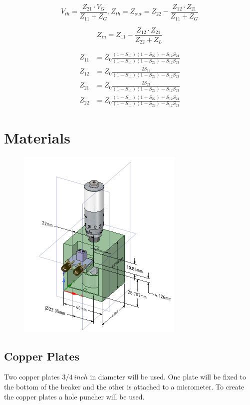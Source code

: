 \documentclass[journal]{IEEEtran}
\begin{document}
\begin{equation}
\label{thevenin-equation-1}
V_{th} = \frac{Z_{21}\cdot V_G}{Z_{11}+Z_{G}}, Z_{th}=Z_{out}=Z_{22}-\frac{Z_{12}\cdot Z_{21}}{Z_{11}+Z_G}
\end{equation}

\begin{equation}
\label{thevenin-equation-1}
Z_{in}=Z_{11}-\frac{Z_{12}\cdot Z_{21}}{Z_{22}+Z_L}
\end{equation}

\begin{align*}
\label{s-conversion-z}
Z_{11} &= Z_0\frac{(1+S_{11})(1-S_{22})+S_{12}S_{21}}{ (1-S_{11})(1-S_{22})-S_{12}S_{21}} \\
Z_{12} &= Z_0\frac{2S_{12}}{ (1-S_{11})(1-S_{22})-S_{12}S_{21}} \\
Z_{21} &= Z_0\frac{2S_{21}}{ (1-S_{11})(1-S_{22})-S_{12}S_{21}} \\
Z_{22} &= Z_0\frac{ (1-S_{11})(1+S_{22})+S_{12}S_{21}}{ (1-S_{11})(1-S_{22})-S_{12}S_{21}}
\end{align*}

\section{Materials}

\begin{figure}[h]
\label{test-fixture}
\includegraphics[width=8cm]{Combined_Test_Fixture.png}
\end{figure}

\subsection{Copper Plates}
Two copper plates $3/4 \: inch$ in diameter will be used. One plate will be fixed to the bottom of the beaker and the other is attached to a micrometer. To create the copper plates a hole puncher will be used.
\end{document}
